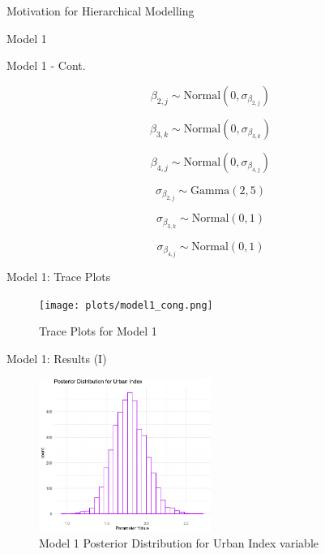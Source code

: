 \documentclass{beamer}
\begin{document}
\begin{frame}{Motivation for Hierarchical Modelling}
\begin{frame}{Model 1}
\end{frame}

\begin{frame}{Model 1 - Cont.}

\[\beta_{2,j} \sim \text{Normal}(0, \sigma_{\beta_{2,j}})\]

\[\beta_{3,k} \sim \text{Normal}(0, \sigma_{\beta_{3,k}})\]

\[\beta_{4,j} \sim \text{Normal}(0, \sigma_{\beta_{4,j}})\]

\[\sigma_{\beta_{2,j}} \sim \text{Gamma}(2,5) \]

\[\sigma_{\beta_{3,k}} \sim \text{Normal}(0,1) \]

\[\sigma_{\beta_{4,j}} \sim \text{Normal}(0,1) \]

\end{frame}

\begin{frame}{Model 1: Trace Plots}
    \begin{center}
        \begin{figure}
            \texttt{[image: plots/model1\_cong.png]}
            \caption{Trace Plots for Model 1}
        \end{figure}
    \end{center}
\end{frame}


\begin{frame}{Model 1: Results (I)}
    \begin{center}
        \begin{figure}
        \caption{Model 1 Posterior Distribution for Urban Index variable}
            \includegraphics[width=0.5\textwidth]{plots/post_urbanindex_model1.png}
        \end{figure}
    \end{center}
\end{frame}


\end{frame}
\end{document}
